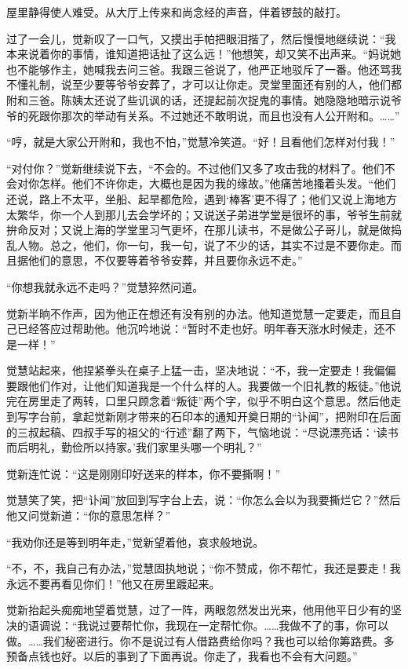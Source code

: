 \par 屋里静得使人难受。从大厅上传来和尚念经的声音，伴着锣鼓的敲打。
\par 过了一会儿，觉新叹了一口气，又摸出手帕把眼泪揩了，然后慢慢地继续说：“我本来说着你的事情，谁知道把话扯了这么远！”他想笑，却又笑不出声来。“妈说她也不能够作主，她喊我去问三爸。我跟三爸说了，他严正地驳斥了一番。他还骂我不懂礼制，说至少要等爷爷安葬了，才可以让你走。灵堂里面还有别的人，他们都附和三爸。陈姨太还说了些讥讽的话，还提起前次捉鬼的事情。她隐隐地暗示说爷爷的死跟你那次的举动有关系。不过她还不敢明说，而且也没有人公开附和。……”
\par “哼，就是大家公开附和，我也不怕，”觉慧冷笑道。“好！且看他们怎样对付我！”
\par “对付你？”觉新继续说下去，“不会的。不过他们又多了攻击我的材料了。他们不会对你怎样。他们不许你走，大概也是因为我的缘故。”他痛苦地搔着头发。“他们还说，路上不太平，坐船、起旱都危险，遇到‘棒客’更不得了；他们又说上海地方太繁华，你一个人到那儿去会学坏的；又说送子弟进学堂是很坏的事，爷爷生前就拚命反对；又说上海的学堂里习气更坏，在那儿读书，不是做公子哥儿，就是做捣乱人物。总之，他们，你一句，我一句，说了不少的话，其实不过是不要你走。而且据他们的意思，不仅要等着爷爷安葬，并且要你永远不走。”
\par “你想我就永远不走吗？”觉慧猝然问道。
\par 觉新半晌不作声，因为他正在想还有没有别的办法。他知道觉慧一定要走，而且自己已经答应过帮助他。他沉吟地说：“暂时不走也好。明年春天涨水时候走，还不是一样！”
\par 觉慧站起来，他捏紧拳头在桌子上猛一击，坚决地说：“不，我一定要走！我偏偏要跟他们作对，让他们知道我是一个什么样的人。我要做一个旧礼教的叛徒。”他说完在房里走了两转，口里只顾念着“叛徒”两个字，似乎不明白这个意思。然后他走到写字台前，拿起觉新刚才带来的石印本的通知开奠日期的“讣闻”，把附印在后面的三叔起稿、四叔手写的祖父的“行述”翻了两下，气恼地说：“尽说漂亮话：‘读书而后明礼，勤俭所以持家。’我们家里头哪一个明礼？”
\par 觉新连忙说：“这是刚刚印好送来的样本，你不要撕啊！”
\par 觉慧笑了笑，把“讣闻”放回到写字台上去，说：“你怎么会以为我要撕烂它？”然后他又问觉新道：“你的意思怎样？”
\par “我劝你还是等到明年走，”觉新望着他，哀求般地说。
\par “不，不，我自己有办法，”觉慧固执地说；“你不赞成，你不帮忙，我还是要走！我永远不要再看见你们！”他又在房里踱起来。
\par 觉新抬起头痴痴地望着觉慧，过了一阵，两眼忽然发出光来，他用他平日少有的坚决的语调说：“我说过要帮忙你，我现在一定帮忙你。……我做不了的事，你可以做。……我们秘密进行。你不是说过有人借路费给你吗？我也可以给你筹路费。多预备点钱也好。以后的事到了下面再说。你走了，我看也不会有大问题。”
